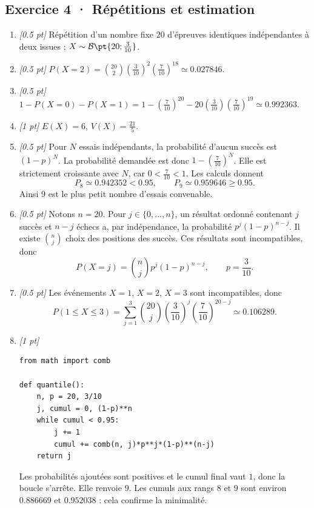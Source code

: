 \subsection*{Exercice 4 · Répétitions et estimation}\begin{enumerate}

\item \textit{[\num{0,5} pt]} Répétition d'un nombre fixe $20$ d'épreuves identiques indépendantes à deux issues ; $X\sim\mathcal B\pt{20;\frac{3}{10}}$.

\item \textit{[\num{0,5} pt]} $P(X=2)=\binom{20}2(\frac{3}{10})^2(\frac{7}{10})^{18}\simeq\num{0,027846}$.

\item \textit{[\num{0,5} pt]} $1-P(X=0)-P(X=1)=1-(\frac{7}{10})^{20}-20(\frac{3}{10})(\frac{7}{10})^{19}\simeq\num{0,992363}$.

\item \textit{[1 pt]} $E(X)=6$, $V(X)=\frac{21}{5}$.

\item \textit{[\num{0,5} pt]} Pour $N$ essais indépendants, la probabilité d'aucun succès est $(1-p)^N$. La probabilité demandée est donc $1-(\frac{7}{10})^N$. Elle est strictement croissante avec $N$, car $0<\frac{7}{10}<1$. Les calculs donnent
\[P_{8}\simeq\num{0,942352}<\num{0,95},\qquad P_{9}\simeq\num{0,959646}\ge\num{0,95}.\]
Ainsi $9$ est le plus petit nombre d'essais convenable.

\item \textit{[\num{0,5} pt]} Notons $n=20$. Pour $j\in\{0,\ldots,n\}$, un résultat ordonné contenant $j$ succès et $n-j$ échecs a, par indépendance, la probabilité $p^j(1-p)^{n-j}$. Il existe $\binom nj$ choix des positions des succès. Ces résultats sont incompatibles, donc
\[P(X=j)=\binom nj p^j(1-p)^{n-j},\qquad p=\frac{3}{10}.\]

\item \textit{[\num{0,5} pt]} Les événements $X=1$, $X=2$, $X=3$ sont incompatibles, donc
\[P(1\le X\le3)=\sum_{j=1}^3\binom{20}j(\frac{3}{10})^j(\frac{7}{10})^{20-j}\simeq\num{0,106289}.\]


\item \textit{[1 pt]} 
\begin{lstlisting}
from math import comb

def quantile():
    n, p = 20, 3/10
    j, cumul = 0, (1-p)**n
    while cumul < 0.95:
        j += 1
        cumul += comb(n, j)*p**j*(1-p)**(n-j)
    return j
\end{lstlisting}
Les probabilités ajoutées sont positives et le cumul final vaut $1$, donc la boucle s'arrête. Elle renvoie $9$. Les cumuls aux rangs $8$ et $9$ sont environ $\num{0,886669}$ et $\num{0,952038}$ : cela confirme la minimalité.

\end{enumerate}

